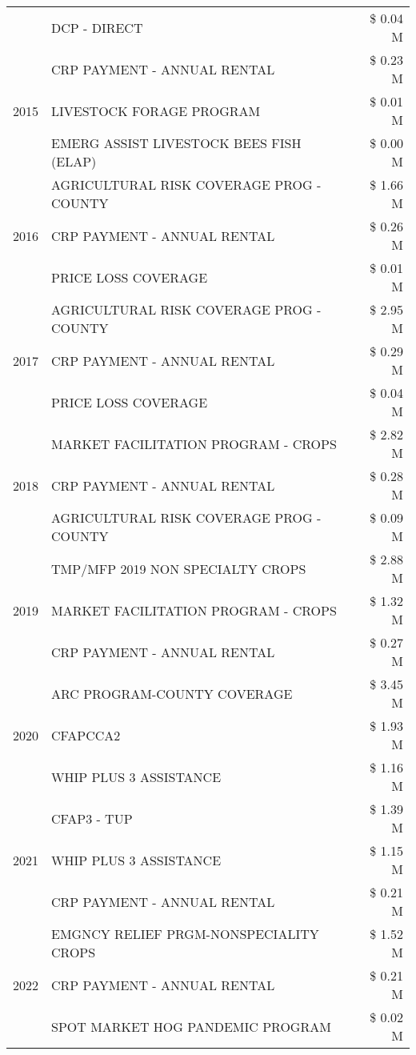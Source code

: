 \begin{tabular}{llr}
 & DCP - DIRECT & \$ 0.04 M \\
\cline{1-3}
\multirow[t]{3}{*}{2015} & CRP PAYMENT - ANNUAL RENTAL & \$ 0.23 M \\
 & LIVESTOCK FORAGE PROGRAM & \$ 0.01 M \\
 & EMERG ASSIST LIVESTOCK BEES FISH (ELAP) & \$ 0.00 M \\
\cline{1-3}
\multirow[t]{3}{*}{2016} & AGRICULTURAL RISK COVERAGE PROG - COUNTY & \$ 1.66 M \\
 & CRP PAYMENT - ANNUAL RENTAL & \$ 0.26 M \\
 & PRICE LOSS COVERAGE & \$ 0.01 M \\
\cline{1-3}
\multirow[t]{3}{*}{2017} & AGRICULTURAL RISK COVERAGE PROG - COUNTY & \$ 2.95 M \\
 & CRP PAYMENT - ANNUAL RENTAL & \$ 0.29 M \\
 & PRICE LOSS COVERAGE & \$ 0.04 M \\
\cline{1-3}
\multirow[t]{3}{*}{2018} & MARKET FACILITATION PROGRAM - CROPS & \$ 2.82 M \\
 & CRP PAYMENT - ANNUAL RENTAL & \$ 0.28 M \\
 & AGRICULTURAL RISK COVERAGE PROG - COUNTY & \$ 0.09 M \\
\cline{1-3}
\multirow[t]{3}{*}{2019} & TMP/MFP 2019 NON SPECIALTY CROPS & \$ 2.88 M \\
 & MARKET FACILITATION PROGRAM - CROPS & \$ 1.32 M \\
 & CRP PAYMENT - ANNUAL RENTAL & \$ 0.27 M \\
\cline{1-3}
\multirow[t]{3}{*}{2020} & ARC PROGRAM-COUNTY COVERAGE & \$ 3.45 M \\
 & CFAPCCA2 & \$ 1.93 M \\
 & WHIP PLUS 3 ASSISTANCE & \$ 1.16 M \\
\cline{1-3}
\multirow[t]{3}{*}{2021} & CFAP3 - TUP & \$ 1.39 M \\
 & WHIP PLUS 3 ASSISTANCE & \$ 1.15 M \\
 & CRP PAYMENT - ANNUAL RENTAL & \$ 0.21 M \\
\cline{1-3}
\multirow[t]{3}{*}{2022} & EMGNCY RELIEF PRGM-NONSPECIALITY CROPS & \$ 1.52 M \\
 & CRP PAYMENT - ANNUAL RENTAL & \$ 0.21 M \\
 & SPOT MARKET HOG PANDEMIC PROGRAM & \$ 0.02 M \\
\cline{1-3}
\bottomrule
\end{tabular}
